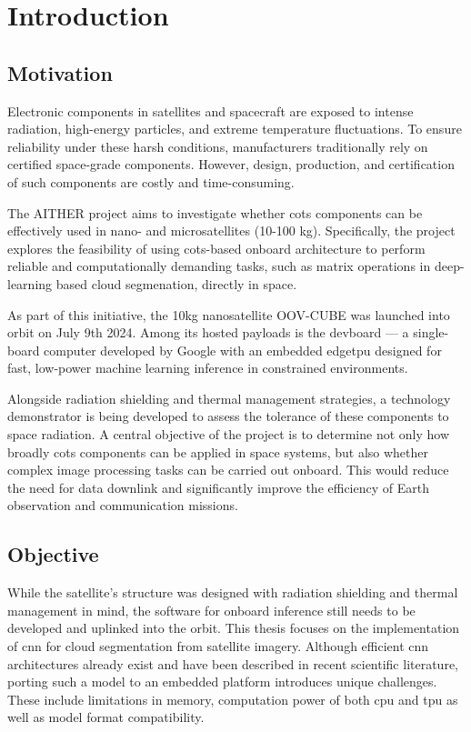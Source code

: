 {

\setlength{\parindent}{0pt}
\setlength{\parskip}{1em}

\chapter{Introduction}
\section{Motivation}

Electronic components in satellites and spacecraft are exposed to intense radiation, high-energy particles, and extreme temperature fluctuations.
To ensure reliability under these harsh conditions, manufacturers traditionally rely on certified space-grade components.
However, design, production, and certification of such components are costly and time\--con\-su\-ming. 

The AITHER project aims to investigate whether \gls{cots} components can be effectively used in nano- and microsatellites (10-100 kg).
Specifically, the project explores the feasibility of using \gls{cots}-based onboard architecture to perform reliable and computationally demanding tasks,
such as matrix operations in deep-learning based cloud segmenation, directly in space. 

As part of this initiative, the 10kg nanosatellite OOV-CUBE was launched into orbit on July 9th 2024.
Among its hosted payloads is the \gls{devboard} --- a single-board computer developed by Google with an embedded \gls{edgetpu} designed for fast,
low-power machine learning inference in constrained environments.

Alongside radiation shielding and thermal management strategies,
a technology demonstrator is being developed to assess the tolerance of these components to space radiation.
A central objective of the project is to determine not only how broadly \gls{cots} components can be applied in space systems,
but also whether complex image processing tasks can be carried out onboard.
This would reduce the need for data downlink and significantly improve the efficiency of Earth observation and communication missions.

\clearpage
\section{Objective}

While the satellite's structure was designed with radiation shielding and thermal management in mind,
the software for onboard inference still needs to be developed and uplinked into the orbit.
This thesis focuses on the implementation of \gls{cnn} for cloud segmentation from satellite imagery.
Although efficient \gls{cnn} architectures already exist and have been described in recent scientific literature,
porting such a model to an embedded platform introduces unique challenges. These include limitations in memory,
computation power of both \gls{cpu} and \gls{tpu} as well as model format compatibility.

}
